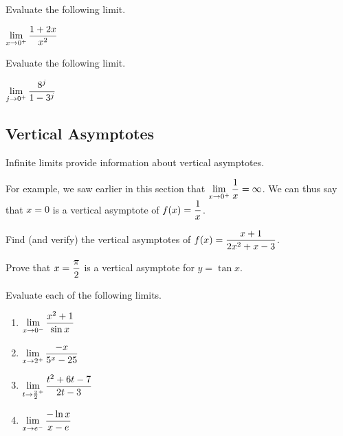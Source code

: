 \documentclass[12pt]{article}
\begin{document}
\vspace{33mm}

\Example Evaluate the following limit.

\vspace{5mm}

\hspace{10mm} $\displaystyle\lim_{x\to 0^+}\frac{1+2x}{x^2}$

\vspace{33mm}

\Example Evaluate the following limit.

\vspace{5mm}

\hspace{10mm} $\displaystyle\lim_{j\to 0^+}\frac{8^j}{1-3^j}$

\newpage

\subsection*{Vertical Asymptotes}

Infinite limits provide information about vertical asymptotes.

\vspace{3mm}


\vspace{3mm}

For example, we saw earlier in this section that $\displaystyle\lim_{x\to 0^+}\frac{1}{x}=\infty$. We can thus say that $x=0$ is a vertical asymptote of $f(x)=\displaystyle\frac{1}{x}$.

\Example Find (and verify) the vertical asymptotes of $f(x)=\displaystyle\frac{x+1}{2x^2+x-3}$.

\vspace{60mm}

\Example Prove that $x=\displaystyle\frac{\pi}{2}$ is a vertical asymptote for $y=\tan x$.

\newpage

\Example Evaluate each of the following limits.

\begin{enumerate}
	\item[\tc{1}] $\displaystyle\lim_{x\to 0^-}\frac{x^2+1}{\sin x}$
	
	\vspace{40mm}
	
	\item[\tc{2}] $\displaystyle\lim_{x\to 2^+}\frac{-x}{5^x-25}$
	
	\vspace{40mm}
	
	\item[\tc{3}] $\displaystyle\lim_{t\to\frac{3}{2}^+}\frac{t^2+6t-7}{2t-3}$
	
	\vspace{40mm}
	
	\item[\tc{4}] $\displaystyle\lim_{x\to e^-}\frac{-\ln x}{x-e}$
\end{enumerate}
\end{document}
